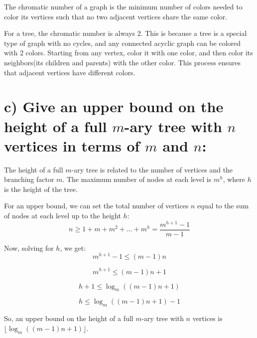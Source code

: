 \documentclass[12pt]{article}
\begin{document}
The chromatic number of a graph is the minimum number of colors needed to color its vertices such that no two adjacent vertices share the same color.

For a tree, the chromatic number is always 2. This is because a tree is a special type of graph with no cycles, and any connected acyclic graph can be colored with 2 colors. Starting from any vertex, color it with one color, and then color its neighbors(its children and parents) with the other color. This process ensures that adjacent vertices have different colors.

\section*{c) Give an upper bound on the height of a full $m$-ary tree with $n$ vertices in terms of $m$ and $n$:}

The height of a full $m$-ary tree is related to the number of vertices and the branching factor $m$. The maximum number of nodes at each level is $m^h$, where $h$ is the height of the tree.

For an upper bound, we can set the total number of vertices $n$ equal to the sum of nodes at each level up to the height $h$:
\[
n \geq 1 + m + m^2 + \ldots + m^h = \frac{m^{h+1} - 1}{m - 1}
\]

Now, solving for $h$, we get:
\[
m^{h+1} - 1 \leq (m - 1)n
\]

\[
m^{h+1} \leq (m - 1)n + 1
\]

\[
h + 1 \leq \log_m((m - 1)n + 1)
\]

\[
h \leq \log_m((m - 1)n + 1) - 1
\]

So, an upper bound on the height of a full $m$-ary tree with $n$ vertices is $\lfloor \log_m((m - 1)n + 1) \rfloor$.
\end{document}
